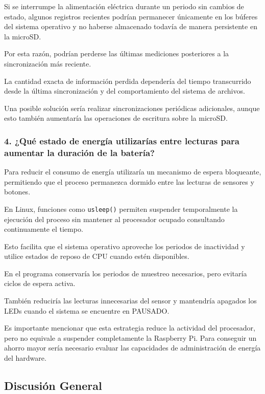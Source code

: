 \documentclass[conference]{IEEEtran}
\begin{document}
Si se interrumpe la alimentación eléctrica durante un periodo sin cambios de estado, algunos registros recientes podrían permanecer únicamente en los búferes del sistema operativo y no haberse almacenado todavía de manera persistente en la microSD.

Por esta razón, podrían perderse las últimas mediciones posteriores a la sincronización más reciente.

La cantidad exacta de información perdida dependería del tiempo transcurrido desde la última sincronización y del comportamiento del sistema de archivos.

Una posible solución sería realizar sincronizaciones periódicas adicionales, aunque esto también aumentaría las operaciones de escritura sobre la microSD.

\subsubsection{4. ¿Qué estado de energía utilizarías entre lecturas para aumentar la duración de la batería?}

Para reducir el consumo de energía utilizaría un mecanismo de espera bloqueante, permitiendo que el proceso permanezca dormido entre las lecturas de sensores y botones.

En Linux, funciones como \texttt{usleep()} permiten suspender temporalmente la ejecución del proceso sin mantener al procesador ocupado consultando continuamente el tiempo.

Esto facilita que el sistema operativo aproveche los periodos de inactividad y utilice estados de reposo de CPU cuando estén disponibles.

En el programa conservaría los periodos de muestreo necesarios, pero evitaría ciclos de espera activa.

También reduciría las lecturas innecesarias del sensor y mantendría apagados los LEDs cuando el sistema se encuentre en PAUSADO.

Es importante mencionar que esta estrategia reduce la actividad del procesador, pero no equivale a suspender completamente la Raspberry Pi. Para conseguir un ahorro mayor sería necesario evaluar las capacidades de administración de energía del hardware.


\subsection{Discusión General}
\end{document}
